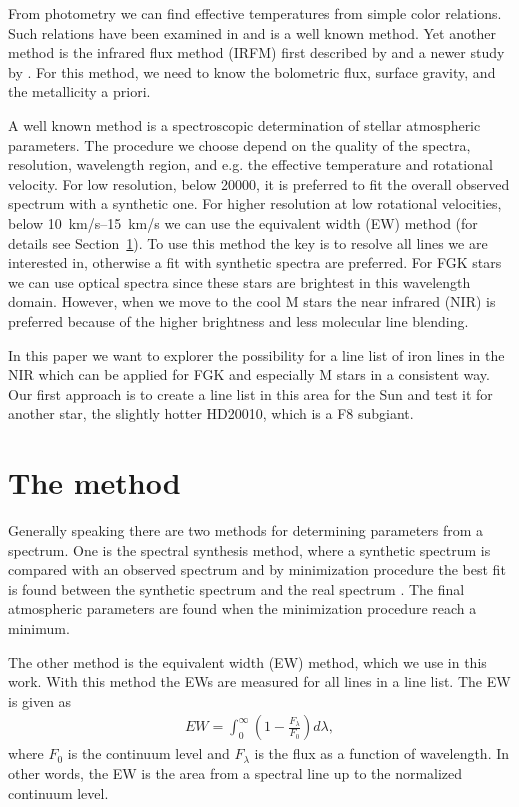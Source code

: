 \documentclass{aa}
\begin{document}
From photometry we can find effective temperatures from simple color
relations. Such relations have been examined in \cite{Ramirez2005a} and
is a well known method. Yet another method is the infrared flux method
(IRFM) first described by \cite{Blackwell1977} and a newer study by
\cite{Ramirez2005b,Casagrande2010}. For this method, we need to know the
bolometric flux, surface gravity, and the metallicity a priori.

A well known method is a spectroscopic determination of stellar
atmospheric parameters. The procedure we choose depend on the quality
of the spectra, resolution, wavelength region, and e.g. the effective
temperature and rotational velocity. For low resolution, below 20000, it
is preferred to fit the overall observed spectrum with a synthetic one.
For higher resolution at low rotational velocities, below
\SIrange{10}{15}{km/s} we can use the equivalent width (EW) method (for details
see Section~\ref{sec:the_method}). To use this method the key is to resolve
all lines we are interested in, otherwise a fit with synthetic spectra
are preferred. For FGK stars we can use optical spectra since these stars
are brightest in this wavelength domain. However, when we move to the cool
M stars the near infrared (NIR) is preferred because of the higher brightness
and less molecular line blending.

In this paper we want to explorer the possibility for a line list of
iron lines in the NIR which can be applied for FGK and especially M
stars in a consistent way. Our first approach is to create a line list
in this area for the Sun and test it for another star, the slightly
hotter HD20010, which is a F8 subgiant.



\section{The method}
\label{sec:the_method}

Generally speaking there are two methods for determining parameters from
a spectrum. One is the spectral synthesis method, where a synthetic
spectrum is compared with an observed spectrum and by minimization
procedure the best fit is found between the synthetic spectrum and the
real spectrum \citep[see e.g.][]{Onehag2012}. The final atmospheric
parameters are found when the minimization procedure reach a minimum.

The other method is the equivalent width (EW) method, which we use in this
work. With this method the EWs are measured for all lines in a line list. The
EW is given as
\begin{align}
    \label{eq:EW}
    EW = \int_0^\infty \left(1 - \frac{F_\lambda}{F_0}\right) d\lambda,
\end{align}
where $F_0$ is the continuum level and $F_\lambda$ is the flux as a function
of wavelength. In other words, the EW is the area from a spectral line up
to the normalized continuum level.
\end{document}
